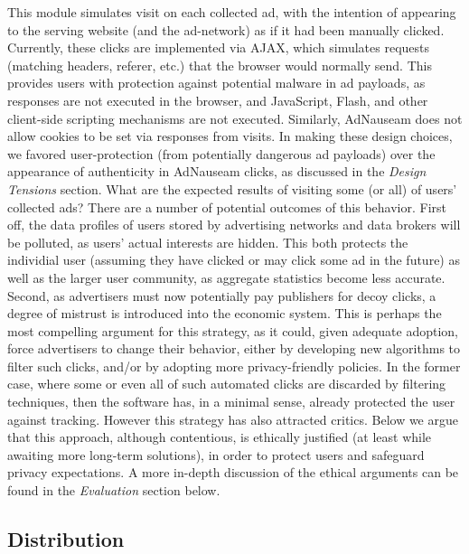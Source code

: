 \documentclass[conference]{IEEEtran}
\begin{document}
This module simulates visit on each collected ad, with the intention of appearing to the serving website (and the ad-network) as if it had been manually clicked. Currently, these clicks are implemented via AJAX, which simulates requests (matching headers, referer, etc.) that the browser would normally send. This provides users with protection against potential malware in ad payloads, as responses are not executed in the browser, and JavaScript, Flash, and other client-side scripting mechanisms are not executed. Similarly, AdNauseam does not allow cookies to be set via responses from visits. In making these design choices, we favored user-protection (from potentially dangerous ad payloads) over the appearance of authenticity in AdNauseam clicks, as discussed in the \emph{Design Tensions} section. What are the expected results of visiting some (or all) of users' collected ads? There are a number of potential outcomes of this behavior. First off, the data profiles of users stored by advertising networks and data brokers will be polluted, as users' actual interests are hidden. This both protects the individial user (assuming they have clicked or may click some ad in the future) as well as the larger user community, as aggregate statistics become less accurate. Second, as advertisers must now potentially pay publishers for decoy clicks, a degree of mistrust is introduced into the economic system. This is perhaps the most compelling argument for this strategy, as it could, given adequate adoption, force advertisers to change their behavior, either by developing new algorithms to filter such clicks, and/or by adopting more privacy-friendly policies. In the former case, where some or even all of such automated clicks are discarded by filtering techniques, then the software has, in a minimal sense, already protected the user against tracking. However this strategy has also attracted critics. Below we argue that this approach, although contentious, is ethically justified (at least while awaiting more long-term solutions), in order to protect users and safeguard privacy expectations. A more in-depth discussion of the ethical arguments can be found in the \emph{Evaluation} section below.


\subsection{Distribution}
\end{document}
